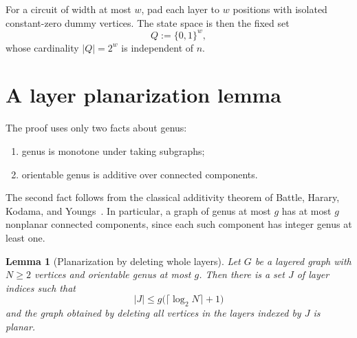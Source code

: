 \documentclass[11pt]{article}
\newtheorem{lemma}[theorem]{Lemma}
\theoremstyle{definition}
\newcommand{\bits}{\{0,1\}}
\begin{document}
For a circuit of width at most $w$, pad each layer to $w$ positions with isolated constant-zero dummy vertices. The state space is then the fixed set
\[
  Q:=\bits^w,
\]
whose cardinality $|Q|=2^w$ is independent of $n$.

\section{A layer planarization lemma}

The proof uses only two facts about genus:
\begin{enumerate}[label=(G\arabic*)]
\item genus is monotone under taking subgraphs;
\item orientable genus is additive over connected components.
\end{enumerate}
The second fact follows from the classical additivity theorem of Battle, Harary, Kodama, and Youngs~\cite{BHKY1962}. In particular, a graph of genus at most $g$ has at most $g$ nonplanar connected components, since each such component has integer genus at least one.

\begin{lemma}[Planarization by deleting whole layers]\label{lem:layer-planarization}
Let $G$ be a layered graph with $N\ge 2$ vertices and orientable genus at most $g$. Then there is a set $J$ of layer indices such that
\[
  |J|\le g\bigl(\lceil\log_2 N\rceil+1\bigr)
\]
and the graph obtained by deleting all vertices in the layers indexed by $J$ is planar.
\end{lemma}
\end{document}
